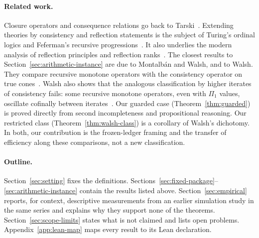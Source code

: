 \paragraph{Related work.}
Closure operators and consequence relations go back to Tarski~\cite{TarskiConsequence1930,TarskiFixedPoint1955}. Extending theories by consistency and reflection statements is the subject of Turing's ordinal logics and Feferman's recursive progressions~\cite{Turing1939,Feferman1962}. It also underlies the modern analysis of reflection principles and reflection ranks~\cite{BeklemishevReflection,PakhomovWalsh2021}. The closest results to Section~\ref{sec:arithmetic-instance} are due to Montalbán and Walsh, and to Walsh. They compare recursive monotone operators with the consistency operator on true cones~\cite{MontalbanWalsh2019,Walsh2020Note}. Walsh also shows that the analogous classification by higher iterates of consistency fails: some recursive monotone operators, even with $\Pi_1$ values, oscillate cofinally between iterates~\cite{Walsh2022Evitable}. Our guarded case (Theorem~\ref{thm:guarded}) is proved directly from second incompleteness and propositional reasoning. Our restricted class (Theorem~\ref{thm:walsh-class}) is a corollary of Walsh's dichotomy. In both, our contribution is the frozen-ledger framing and the transfer of efficiency along these comparisons, not a new classification.

\paragraph{Outline.}
Section~\ref{sec:setting} fixes the definitions. Sections~\ref{sec:fixed-package}--\ref{sec:arithmetic-instance} contain the results listed above. Section~\ref{sec:empirical} reports, for context, descriptive measurements from an earlier simulation study in the same series and explains why they support none of the theorems. Section~\ref{sec:scope-limits} states what is not claimed and lists open problems. Appendix~\ref{app:lean-map} maps every result to its Lean declaration.

